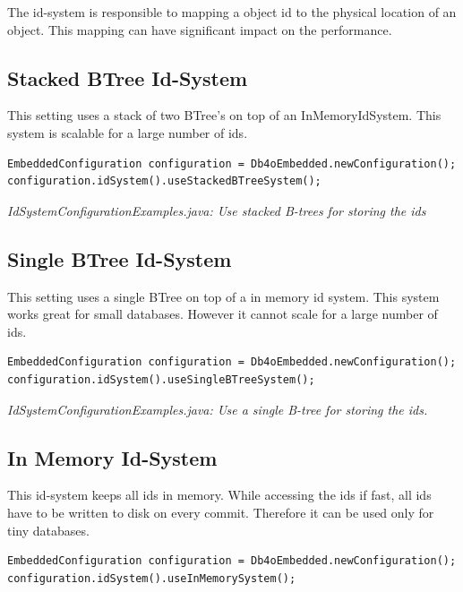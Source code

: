 The id-system is responsible to mapping a object id to the physical location of an object. This mapping can have significant impact on the performance.

\subsection*{Stacked BTree Id-System}

This setting uses a stack of two BTree's on top of an InMemoryIdSystem. This system is scalable for a large number of ids.

\begin{lstlisting}
EmbeddedConfiguration configuration = Db4oEmbedded.newConfiguration();
configuration.idSystem().useStackedBTreeSystem();
\end{lstlisting}

{\small\itshape IdSystemConfigurationExamples.java: Use stacked B-trees for storing the ids\par}
\medskip

\subsection*{Single BTree Id-System}

This setting uses a single BTree on top of a in memory id system. This system works great for small databases. However it cannot scale for a large number of ids.

\begin{lstlisting}
EmbeddedConfiguration configuration = Db4oEmbedded.newConfiguration();
configuration.idSystem().useSingleBTreeSystem();
\end{lstlisting}

{\small\itshape IdSystemConfigurationExamples.java: Use a single B-tree for storing the ids.\par}
\medskip

\subsection*{In Memory Id-System}

This id-system keeps all ids in memory. While accessing the ids if fast, all ids have to be written to disk on every commit. Therefore it can be used only for tiny databases.

\begin{lstlisting}
EmbeddedConfiguration configuration = Db4oEmbedded.newConfiguration();
configuration.idSystem().useInMemorySystem();
\end{lstlisting}

